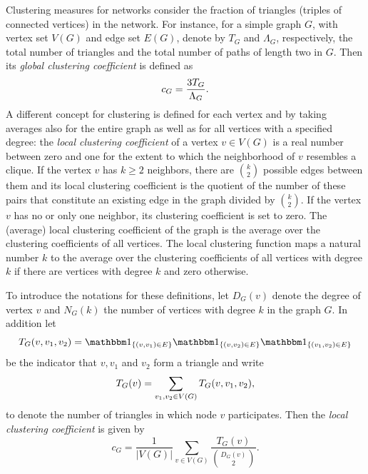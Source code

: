 Clustering measures for networks consider the fraction of triangles (triples of connected vertices) in the network. 
For instance, for a simple graph $G$, with vertex set $V(G)$ and edge set $E(G)$, denote by $T_G$ and $\Lambda_G$, respectively, the total number of triangles and the total number of paths of length two in $G$. Then its \emph{global clustering coefficient} is defined as
\[
	c_G = \frac{3 T_G}{\Lambda_G}.
\]
A different concept for clustering is defined for each vertex and by taking averages also for the entire graph as well as for all vertices with a specified degree: the \emph{local clustering coefficient} of a vertex $v \in V(G)$ is a real number between zero and one for the extent to which the neighborhood of $v$ resembles a clique. If the vertex $v$ has $k\geq 2$ neighbors, there are ${k \choose 2}$ possible edges between them and its local clustering coefficient is the quotient of the number of these pairs that constitute an existing edge in the graph divided by ${k \choose 2}$. If the vertex $v$ has no or only one neighbor, its clustering coefficient is set to zero. The (average) local clustering coefficient of the graph is the average over the clustering coefficients of all vertices. The local clustering function maps a natural number $k$ to the average over the clustering coefficients of all vertices with degree $k$ if there are vertices with degree $k$ and zero otherwise.

To introduce the notations for these definitions, let $D_G(v)$ denote the degree of vertex $v$ and $N_G(k)$ the number of vertices with degree $k$ in the graph $G$. In addition let $$\T_G(v,v_1,v_2) = \ind{(v,v_1) \in E} \ind{(v, v_2) \in E} \ind{(v_1, v_2) \in E}$$ be the indicator that $v, v_1$ and $v_2$ form a triangle and write
\begin{equation}
	T_G(v) = \sum_{v_1, v_2 \in V(G)} T_G(v,v_1,v_2),
\end{equation}
to denote the number of triangles in which node $v$ participates. Then the \emph{local clustering coefficient} is given by
\[
	c_G = \frac{1}{|V(G)|} \sum_{v \in V(G)} \frac{T_G(v)}{\binom{D_G(v)}{2}}.
\]

